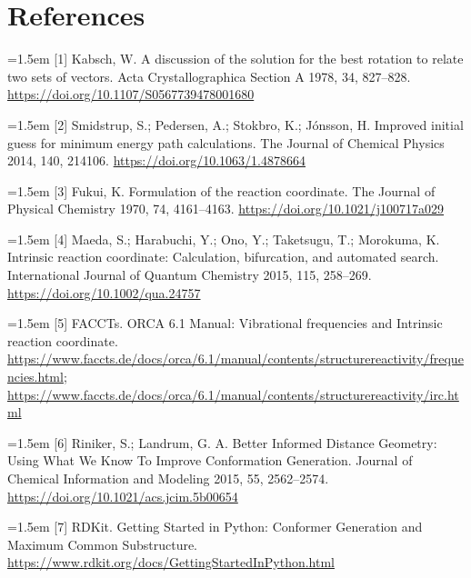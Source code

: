 \section*{References}
\begingroup\fontsize{8.5}{10.5}\selectfont
\par\noindent\hangindent=1.5em [1] Kabsch, W. A discussion of the solution for the best rotation to relate two sets of vectors. Acta Crystallographica Section A 1978, 34, 827–828. \url{https://doi.org/10.1107/S0567739478001680}\par\smallskip
\par\noindent\hangindent=1.5em [2] Smidstrup, S.; Pedersen, A.; Stokbro, K.; Jónsson, H. Improved initial guess for minimum energy path calculations. The Journal of Chemical Physics 2014, 140, 214106. \url{https://doi.org/10.1063/1.4878664}\par\smallskip
\par\noindent\hangindent=1.5em [3] Fukui, K. Formulation of the reaction coordinate. The Journal of Physical Chemistry 1970, 74, 4161–4163. \url{https://doi.org/10.1021/j100717a029}\par\smallskip
\par\noindent\hangindent=1.5em [4] Maeda, S.; Harabuchi, Y.; Ono, Y.; Taketsugu, T.; Morokuma, K. Intrinsic reaction coordinate: Calculation, bifurcation, and automated search. International Journal of Quantum Chemistry 2015, 115, 258–269. \url{https://doi.org/10.1002/qua.24757}\par\smallskip
\par\noindent\hangindent=1.5em [5] FACCTs. ORCA 6.1 Manual: Vibrational frequencies and Intrinsic reaction coordinate. \url{https://www.faccts.de/docs/orca/6.1/manual/contents/structurereactivity/frequencies.html}; \url{https://www.faccts.de/docs/orca/6.1/manual/contents/structurereactivity/irc.html}\par\smallskip
\par\noindent\hangindent=1.5em [6] Riniker, S.; Landrum, G. A. Better Informed Distance Geometry: Using What We Know To Improve Conformation Generation. Journal of Chemical Information and Modeling 2015, 55, 2562–2574. \url{https://doi.org/10.1021/acs.jcim.5b00654}\par\smallskip
\par\noindent\hangindent=1.5em [7] RDKit. Getting Started in Python: Conformer Generation and Maximum Common Substructure. \url{https://www.rdkit.org/docs/GettingStartedInPython.html}\par\smallskip
\endgroup
